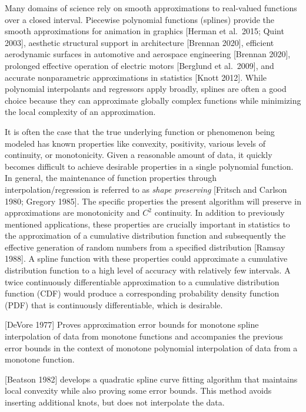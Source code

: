 
Many domains of science rely on smooth approximations to real-valued
functions over a closed interval. Piecewise polynomial functions
(splines) provide the smooth approximations for animation in graphics
[Herman et al.\ 2015; Quint 2003], aesthetic structural support in
architecture [Brennan 2020], efficient aerodynamic surfaces in
automotive and aerospace engineering [Brennan 2020], prolonged
effective operation of electric motors [Berglund et al.\ 2009], and
accurate nonparametric approximations in statistics [Knott
2012]. While polynomial interpolants and regressors apply broadly,
splines are often a good choice because they can approximate globally
complex functions while minimizing the local complexity of an
approximation.

It is often the case that the true underlying function or phenomenon
being modeled has known properties like convexity, positivity,
various levels of continuity, or monotonicity. Given a reasonable
amount of data, it quickly becomes difficult to achieve desirable
properties in a single polynomial function. In general, the
maintenance of function properties through interpolation/regression is
referred to as {\it shape preserving} [Fritsch and Carlson 1980;
Gregory 1985]. The specific properties the present algorithm will
preserve in approximations are monotonicity and $C^2$ continuity. In
addition to previously mentioned applications, these properties are
crucially important in statistics to the approximation of a cumulative
distribution function and subsequently the effective generation of
random numbers from a specified distribution [Ramsay 1988].  A spline
function with these properties could approximate a cumulative
distribution function to a high level of accuracy with relatively few
intervals. A twice continuously differentiable approximation to a
cumulative distribution function (CDF) would produce a corresponding
probability density function (PDF) that is continuously
differentiable, which is desirable.


[DeVore 1977] Proves approximation error bounds for monotone spline interpolation of data from monotone functions and accompanies the previous error bounds in the context of monotone polynomial interpolation of data from a monotone function.

[Beatson 1982] develops a quadratic spline curve fitting algorithm that maintains local convexity while also proving some error bounds. This method avoids inserting additional knots, but does not interpolate the data.

